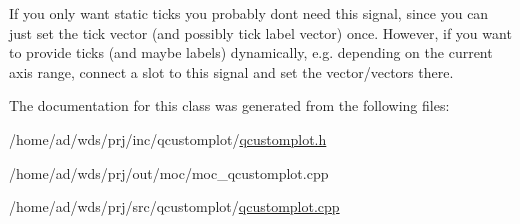 If you only want static ticks you probably don\textquotesingle{}t need this signal, since you can just set the tick vector (and possibly tick label vector) once. However, if you want to provide ticks (and maybe labels) dynamically, e.\+g. depending on the current axis range, connect a slot to this signal and set the vector/vectors there. 

The documentation for this class was generated from the following files\+:\begin{DoxyCompactItemize}
\item 
/home/ad/wds/prj/inc/qcustomplot/\hyperlink{qcustomplot_8h}{qcustomplot.\+h}\item 
/home/ad/wds/prj/out/moc/moc\+\_\+qcustomplot.\+cpp\item 
/home/ad/wds/prj/src/qcustomplot/\hyperlink{qcustomplot_8cpp}{qcustomplot.\+cpp}\end{DoxyCompactItemize}
